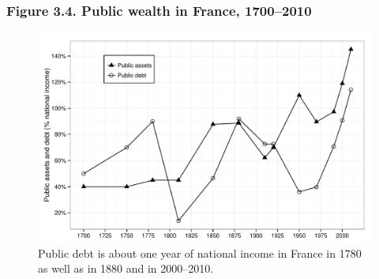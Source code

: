 \documentclass[t]{beamer}\usepackage[]{graphicx}\usepackage[]{color}
\newenvironment{knitrout}{}{} %
\begin{document}
\begin{frame}[label=Figure_3_4]
\frametitle{Figure 3.4. Public wealth in France, 1700--2010}
\begin{figure}[t]
\begin{minipage}[b]{\textwidth}
\centering
\begin{knitrout}\footnotesize
{}\color{fgcolor}

{\centering \includegraphics[width=1\linewidth]{figures/bw/Figure_3_4} 

}



\end{knitrout}
\caption{Public debt is about one year of national income in France in 1780 as well as in 1880 and in 2000--2010.}
\end{minipage}
\end{figure}
\end{frame}
\end{document}
